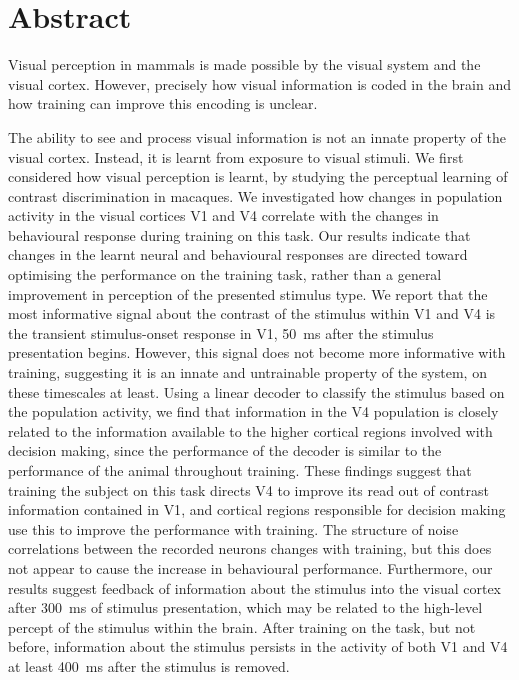 \begingroup
\let\clearpage\relax
\let\cleardoublepage\relax
\let\cleardoublepage\relax

\chapter*{Abstract}

Visual perception in mammals is made possible by the visual system and the visual cortex.
However, precisely how visual information is coded in the brain and how training can improve this encoding is unclear.

The ability to see and process visual information is not an innate property of the visual cortex.
Instead, it is learnt from exposure to visual stimuli.
We first considered how visual perception is learnt, by studying the perceptual learning of contrast discrimination in macaques.
We investigated how changes in population activity in the visual cortices \acs{V1} and \acs{V4} correlate with the changes in behavioural response during training on this task.
Our results indicate that changes in the learnt neural and behavioural responses are directed toward optimising the performance on the training task, rather than a general improvement in perception of the presented stimulus type.
We report that the most informative signal about the contrast of the stimulus within \acs{V1} and \acs{V4} is the transient stimulus-onset response in \acs{V1}, \SI{50}{\milli\second} after the stimulus presentation begins.
However, this signal does not become more informative with training, suggesting it is an innate and untrainable property of the system, on these timescales at least.
Using a linear decoder to classify the stimulus based on the population activity, we find that information in the \acs{V4} population is closely related to the information available to the higher cortical regions involved with decision making, since the performance of the decoder is similar to the performance of the animal throughout training.
These findings suggest that training the subject on this task directs \acs{V4} to improve its read out of contrast information contained in \acs{V1}, and cortical regions responsible for decision making use this to improve the performance with training.
The structure of noise correlations between the recorded neurons changes with training, but this does not appear to cause the increase in behavioural performance.
Furthermore, our results suggest feedback of information about the stimulus into the visual cortex after \SI{300}{\milli\second} of stimulus presentation, which may be related to the high-level percept of the stimulus within the brain.
After training on the task, but not before, information about the stimulus persists in the activity of both \acs{V1} and \acs{V4} at least \SI{400}{\milli\second} after the stimulus is removed.

